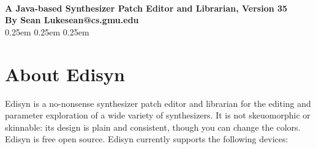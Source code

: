 \documentclass{article}
\begin{document}
\\[0.5em]
{\large \bf A Java-based Synthesizer Patch Editor and Librarian, Version 35\\[0.2em]
By Sean Luke\qquad sean@cs.gmu.edu}\\[0.2em]

\vspace{-1em}
\setcounter{tocdepth}{2}
\advance\cftsecnumwidth 0.25em\relax
\advance\cftsubsecindent 0.25em\relax
\advance\cftsubsecnumwidth 0.25em\relax
\tableofcontents

\clearpage

\section{About Edisyn}

Edisyn is a no-nonsense synthesizer patch editor and librarian for the editing and parameter exploration of a wide variety of synthesizers.  It is not skeuomorphic or skinnable: its design is plain and consistent, though you can change the colors.  Edisyn is free open source.  Edisyn currently supports the following devices: 
\end{document}
